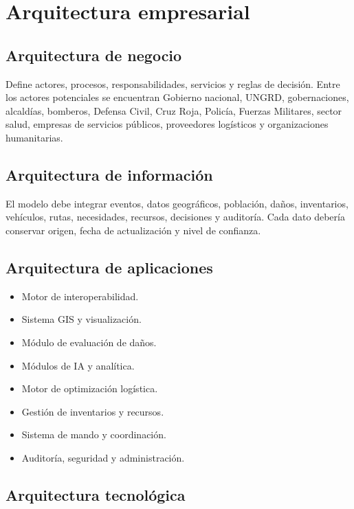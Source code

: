 \documentclass[11pt,a4paper]{article}
\begin{document}
\section{Arquitectura empresarial}

\subsection{Arquitectura de negocio}

Define actores, procesos, responsabilidades, servicios y reglas de decisión.
Entre los actores potenciales se encuentran Gobierno nacional, UNGRD,
gobernaciones, alcaldías, bomberos, Defensa Civil, Cruz Roja, Policía, Fuerzas
Militares, sector salud, empresas de servicios públicos, proveedores
logísticos y organizaciones humanitarias.

\subsection{Arquitectura de información}

El modelo debe integrar eventos, datos geográficos, población, daños,
inventarios, vehículos, rutas, necesidades, recursos, decisiones y auditoría.
Cada dato debería conservar origen, fecha de actualización y nivel de
confianza.

\subsection{Arquitectura de aplicaciones}

\begin{itemize}[leftmargin=*]
  \item Motor de interoperabilidad.
  \item Sistema GIS y visualización.
  \item Módulo de evaluación de daños.
  \item Módulos de IA y analítica.
  \item Motor de optimización logística.
  \item Gestión de inventarios y recursos.
  \item Sistema de mando y coordinación.
  \item Auditoría, seguridad y administración.
\end{itemize}

\subsection{Arquitectura tecnológica}
\end{document}
